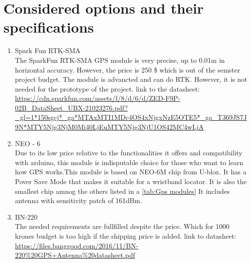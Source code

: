 \section{Considered options and their specifications}
\begin{enumerate}
    \item Spark Fun RTK-SMA\\
    The SparkFun RTK-SMA GPS module is very precise, up to 0.01m in horizontal accuracy. However,
    the price is 250 \$ which is out of the semster project budget. The module is advancted and can do RTK. 
    However, it is not needed for the prototype of the project.
    link to the datasheet: \url{https://cdn.sparkfun.com/assets/f/8/d/6/d/ZED-F9P-02B_DataSheet_UBX-21023276.pdf?_gl=1*150sgcj*_ga*MTAxMTI1MDc4OS4xNjgxNzE5OTE5*_ga_T369JS7J9N*MTY5Njg3NjM0Mi40LjEuMTY5Njg3NjU1OS42MC4wLjA}
       
    \item NEO - 6\\
    Due to its low price relative to the functionalities it offers and compatibility with arduino, 
    this module is indisputable choice for those who want to learn how GPS works.This module is based on NEO-6M chip from U-blox. 
    It has a Pover Save Mode that makes it suitable for a wristband locator. It is also the smallest chip amnog the others listed in a  \autoref{tab:Gps modules}
    It includes antenna with sensitivity patch of 161dBm.
    \item BN-220\\
    The needed requirements are fullfilled despite the price. Which for 1000 krones budget is too high if the shipping price is added.
link to datasheet: \url{https://files.banggood.com/2016/11/BN-220%20GPS+Antenna%20datasheet.pdf} 
\cite{1}



\end{enumerate}



